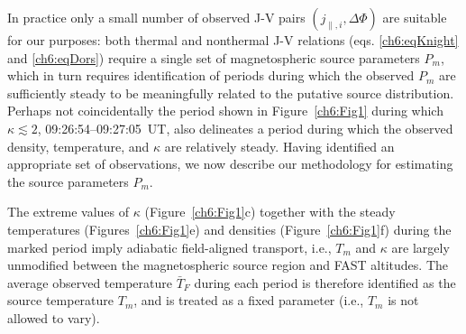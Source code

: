   In practice only a small number of observed J-V pairs $(
  j_{\parallel,i} , \Delta \Phi )$ are suitable for our purposes: both
  thermal and nonthermal J-V relations (eqs. \ref{ch6:eqKnight} and
  \ref{ch6:eqDors}) require a single set of magnetospheric source
  parameters $P_m$, which in turn requires identification of periods
  during which the observed $P_m$ are sufficiently steady to be
  meaningfully related to the putative source distribution. Perhaps
  not coincidentally the period shown in Figure~\ref{ch6:Fig1} during
  which $\kappa \lesssim 2$, 09:26:54--09:27:05~UT, also delineates a
  period during which the observed density, temperature, and $\kappa$
  are relatively steady. Having identified an appropriate set of
  observations, we now describe our methodology for estimating the
  source parameters $P_m$.

  The extreme values of $\kappa$ (Figure~\ref{ch6:Fig1}c) together with
  the steady temperatures (Figures~\ref{ch6:Fig1}e) and densities
  (Figure~\ref{ch6:Fig1}f) during the marked period imply adiabatic
  field-aligned transport, i.e., $T_m$ and $\kappa$ are largely
  unmodified between the magnetospheric source region and FAST
  altitudes. The average observed temperature $\bar{T}_F$ during each
  period is therefore identified as the source temperature $T_m$, and
  is treated as a fixed parameter (i.e., $T_m$ is not allowed to vary).
  
